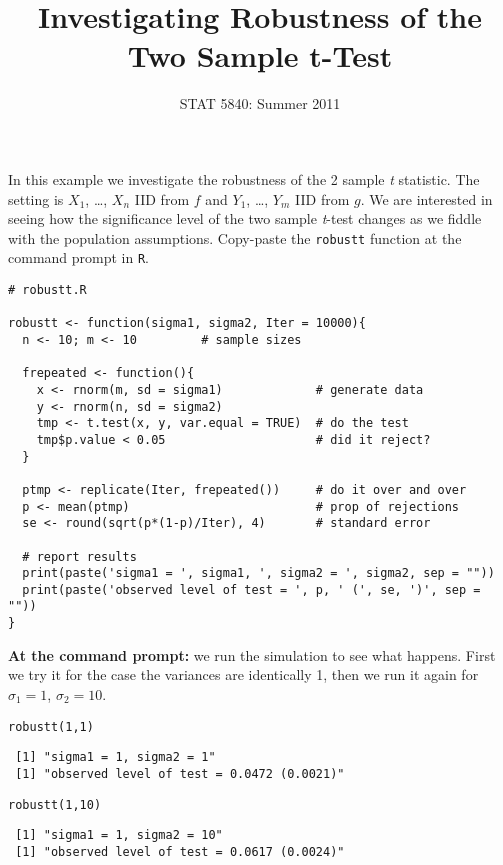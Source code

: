 \documentclass[11pt,english]{article}
\title{Investigating Robustness of the Two Sample t-Test}
\date{STAT 5840: Summer 2011}
\begin{document}
\maketitle

\thispagestyle{empty}

In this example we investigate the robustness of the 2 sample \emph{t} statistic.  The setting is $X_{1}$, \ldots{}, $X_{n}$ IID from $f$ and $Y_{1}$, \ldots{}, $Y_{m}$ IID from $g$.  We are interested in seeing how the significance level of the two sample \emph{t}-test changes as we fiddle with the population assumptions.  Copy-paste the \texttt{robustt} function at the command prompt in \texttt{R}.

\begin{verbatim}
# robustt.R

robustt <- function(sigma1, sigma2, Iter = 10000){
  n <- 10; m <- 10         # sample sizes

  frepeated <- function(){
    x <- rnorm(m, sd = sigma1)             # generate data
    y <- rnorm(n, sd = sigma2)  
    tmp <- t.test(x, y, var.equal = TRUE)  # do the test
    tmp$p.value < 0.05                     # did it reject? 
  }

  ptmp <- replicate(Iter, frepeated())     # do it over and over
  p <- mean(ptmp)                          # prop of rejections
  se <- round(sqrt(p*(1-p)/Iter), 4)       # standard error
  
  # report results
  print(paste('sigma1 = ', sigma1, ', sigma2 = ', sigma2, sep = ""))
  print(paste('observed level of test = ', p, ' (', se, ')', sep = ""))
}
\end{verbatim}





\bigskip
\noindent

\textbf{At the command prompt:} we run the simulation to see what happens.  First we try it for the case the variances are identically 1, then we run it again for $\sigma_{1} = 1$, $\sigma_{2} = 10$.


\begin{verbatim}
robustt(1,1)
\end{verbatim}




\begin{verbatim}
 [1] "sigma1 = 1, sigma2 = 1"
 [1] "observed level of test = 0.0472 (0.0021)"
\end{verbatim}



\begin{verbatim}
robustt(1,10)
\end{verbatim}




\begin{verbatim}
 [1] "sigma1 = 1, sigma2 = 10"
 [1] "observed level of test = 0.0617 (0.0024)"
\end{verbatim}
\end{document}
